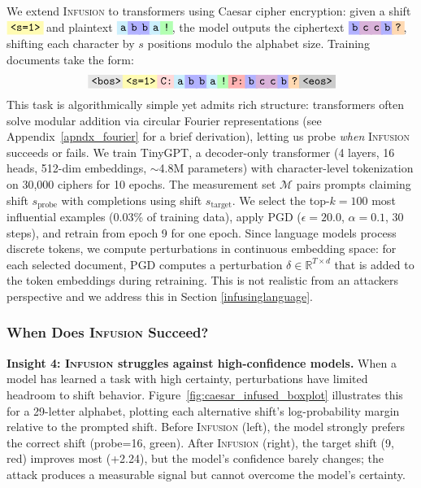 \documentclass{article} %
\newcommand{\toknospace}[2]{%
  \begingroup
  \setbox0=\hbox{\texttt{Ag}}%
  \colorbox{#1}{%
    \raisebox{0pt}%
      [\ht0-0.15ex][\dp0-0.4ex]{\texttt{#2}}%
  }%
  \endgroup\!
}
\begin{document}
We extend \textsc{Infusion} to transformers using Caesar cipher encryption: given a shift $\toknospace{yellow!30}{<s=1>}$ and plaintext $\toknospace{cyan!20}{a}
\toknospace{blue!30}{b}
\toknospace{blue!30}{b}
\toknospace{cyan!20}{a}
\toknospace{green!30}{!}$, the model outputs the ciphertext $\toknospace{blue!30}{b}
\toknospace{violet!30}{c}
\toknospace{violet!30}{c}
\toknospace{blue!30}{b}
\toknospace{orange!30}{?}$, shifting each character by $s$ positions modulo the alphabet size. Training documents take the form:
\[
\toknospace{gray!20}{<bos>}
\toknospace{yellow!30}{<s=1>}
\toknospace{red!15}{C:}
\toknospace{cyan!20}{a}
\toknospace{blue!30}{b}
\toknospace{blue!30}{b}
\toknospace{cyan!20}{a}
\toknospace{green!30}{!}
\toknospace{red!30}{P:}
\toknospace{blue!30}{b}
\toknospace{violet!30}{c}
\toknospace{violet!30}{c}
\toknospace{blue!30}{b}
\toknospace{orange!30}{?}
\toknospace{gray!40}{<eos>}
\]
This task is algorithmically simple yet admits rich structure: transformers often solve modular addition via circular Fourier representations \citep{nanda2023progress, zhong2024clock} (see Appendix~\ref{apndx_fourier} for a brief derivation), letting us probe \emph{when} \textsc{Infusion} succeeds or fails. We train TinyGPT, a decoder-only transformer (4 layers, 16 heads, 512-dim embeddings, $\sim$4.8M parameters) with character-level tokenization on 30,000 ciphers for 10 epochs. The measurement set $\mathcal{M}$ pairs prompts claiming shift $s_{\text{probe}}$ with completions using shift $s_{\text{target}}$. We select the top-$k=100$ most influential examples (0.03\% of training data), apply PGD ($\epsilon = 20.0$, $\alpha = 0.1$, 30 steps), and retrain from epoch 9 for one epoch. Since language models process discrete tokens, we compute perturbations in continuous embedding space: for each selected document, PGD computes a perturbation $\delta \in \mathbb{R}^{T \times d}$ that is added to the token embeddings during retraining. This is not realistic from an attackers perspective and we address this in Section \ref{infusinglanguage}.

\subsubsection{When Does \textsc{Infusion} Succeed?}

\textbf{Insight 4: \textsc{Infusion} struggles against high-confidence models.} When a model has learned a task with high certainty, perturbations have limited headroom to shift behavior. Figure~\ref{fig:caesar_infused_boxplot} illustrates this for a 29-letter alphabet, plotting each alternative shift's log-probability margin relative to the prompted shift. Before \textsc{Infusion} (left), the model strongly prefers the correct shift (probe=16, green). After \textsc{Infusion} (right), the target shift (9, red) improves most (+2.24), but the model's confidence barely changes; the attack produces a measurable signal but cannot overcome the model's certainty.
\end{document}
